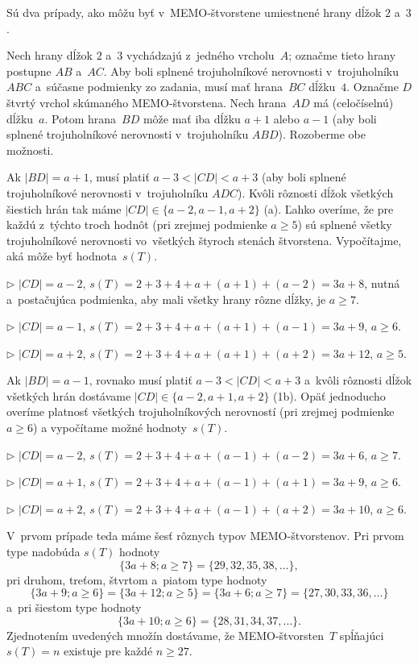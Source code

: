 {%
Sú dva prípady, ako môžu byť v~MEMO-štvorstene umiestnené hrany dĺžok $2$ a~$3$.

Nech hrany dĺžok $2$ a~$3$ vychádzajú z~jedného vrcholu~$A$; označme tieto hrany postupne $AB$ a~$AC$. Aby boli splnené trojuholníkové nerovnosti v~trojuholníku $ABC$ a~súčasne podmienky zo zadania, musí mať hrana~$BC$ dĺžku~$4$. Označme $D$ štvrtý vrchol skúmaného MEMO-štvorstena. Nech hrana~$AD$ má (celočíselnú) dĺžku~$a$. Potom hrana~$BD$ môže mať iba dĺžku $a+1$ alebo $a-1$ (aby boli splnené trojuholníkové nerovnosti v~trojuholníku $ABD$). Rozoberme obe možnosti.

Ak $|BD|=a+1$, musí platiť $a-3<|CD|<a+3$ (aby boli splnené trojuholníkové nerovnosti v~trojuholníku $ADC$). Kvôli rôznosti dĺžok všetkých šiestich hrán tak máme $|CD|\in\{a-2,a-1,a+2\}$ (\obr{}a). Ľahko overíme, že pre každú z~týchto troch hodnôt (pri zrejmej podmienke $a\ge5$) sú splnené všetky trojuholníkové nerovnosti vo~všetkých štyroch stenách štvorstena. Vypočítajme, aká môže byť hodnota~$s(T)$. 
\item{$\triangleright$} $|CD|=a-2$, $s(T)=2+3+4+a+(a+1)+(a-2)=3a+8$, nutná a~postačujúca podmienka, aby mali všetky hrany rôzne dĺžky, je $a\ge7$.
\item{$\triangleright$} $|CD|=a-1$, $s(T)=2+3+4+a+(a+1)+(a-1)=3a+9$, $a\ge6$.
\item{$\triangleright$} $|CD|=a+2$, $s(T)=2+3+4+a+(a+1)+(a+2)=3a+12$, $a\ge5$.

Ak $|BD|=a-1$, rovnako musí platiť $a-3<|CD|<a+3$ a~kvôli rôznosti dĺžok všetkých hrán dostávame $|CD|\in\{a-2,a+1,a+2\}$  (\obrr1b). Opäť jednoducho overíme platnosť všetkých trojuholníkových nerovností (pri zrejmej podmienke $a\ge6$) a vypočítame možné hodnoty~$s(T)$. 
\item{$\triangleright$} $|CD|=a-2$, $s(T)=2+3+4+a+(a-1)+(a-2)=3a+6$, $a\ge7$.
\item{$\triangleright$} $|CD|=a+1$, $s(T)=2+3+4+a+(a-1)+(a+1)=3a+9$, $a\ge6$.
\item{$\triangleright$} $|CD|=a+2$, $s(T)=2+3+4+a+(a-1)+(a+2)=3a+10$, $a\ge6$.
%

V~prvom prípade teda máme šesť rôznych typov MEMO-štvorstenov. Pri prvom type nadobúda $s(T)$ hodnoty
$$
\{3a+8;a\ge7\}=\{29,32,35,38,\dots\},
$$
pri druhom, treťom, štvrtom a~piatom type hodnoty
$$
\{3a+9;a\ge6\}=\{3a+12;a\ge5\}=\{3a+6;a\ge7\}=\{27,30,33,36,\dots\}
$$
a~pri šiestom type hodnoty
$$
\{3a+10;a\ge6\}=\{28,31,34,37,\dots\}.
$$
Zjednotením uvedených množín dostávame, že MEMO-štvorsten~$T$ spĺňajúci $s(T)=n$ existuje pre každé $n\ge27$.

}
